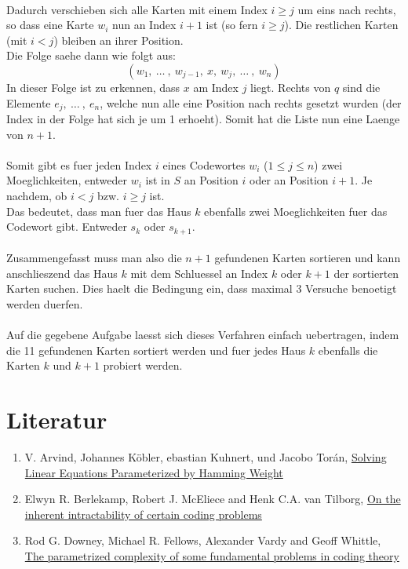 \documentclass[a4paper,10pt,ngerman]{scrartcl}
\begin{document}
\\Dadurch verschieben sich alle Karten mit einem Index $i \geq j$ um eins nach rechts, so dass eine Karte $w_i$ nun an Index $i+1$ ist (so fern $i \geq j$). Die restlichen Karten (mit $i < j$) bleiben an ihrer Position.\\
Die Folge saehe dann wie folgt aus:
$$(w_1, \ \dots \ , \ w_{j-1}, \ x, \ w_{j}, \ \dots \ , \ w_n)$$
In dieser Folge ist zu erkennen, dass $x$ am Index $j$ liegt. Rechts von $q$ sind die Elemente $e_{j}, \ \dots \ , \ e_n$, welche nun alle eine Position nach rechts  gesetzt wurden (der Index in der Folge hat sich je um 1 erhoeht). Somit hat die Liste nun eine Laenge von $n+1$.
\\\\
Somit gibt es fuer jeden Index $i$ eines Codewortes $w_i$ ($1 \leq j \leq n$) zwei Moeglichkeiten, entweder $w_i$ ist in $S$ an Position $i$ oder an Position $i+1$.
Je nachdem, ob $i < j$ bzw. $i \geq j$ ist.\\
Das bedeutet, dass man fuer das Haus $k$ ebenfalls zwei Moeglichkeiten fuer das Codewort gibt. Entweder $s_k$ oder $s_{k+1}$. 
\\\\
Zusammengefasst muss man also die $n+1$ gefundenen Karten sortieren und kann anschlieszend das Haus $k$ mit dem Schluessel an Index $k$ oder $k+1$ der sortierten Karten suchen. Dies haelt die Bedingung ein, dass maximal 3 Versuche benoetigt werden duerfen.
\\\\
Auf die gegebene Aufgabe laesst sich dieses Verfahren einfach uebertragen, indem die 11 gefundenen Karten sortiert werden und fuer jedes Haus $k$ ebenfalls die Karten $k$ und $k+1$ probiert werden. 

\section{Literatur}
\begin{enumerate}
	\item V. Arvind, Johannes Köbler, ebastian Kuhnert, und Jacobo Torán, \href{https://www.informatik.hu-berlin.de/de/forschung/gebiete/algorithmenII/Publikationen/Papers/oddeven.pdf}{Solving Linear Equations Parameterized by Hamming Weight}
	\item Elwyn R. Berlekamp, Robert J. McEliece and Henk C.A. van Tilborg, \href{https://ieeexplore.ieee.org/document/1055873}{On the inherent intractability of certain coding problems}
	\item Rod G. Downey, Michael R. Fellows, Alexander Vardy and Geoff Whittle, \href{https://epubs.siam.org/doi/10.1137/S0097539797323571}{The parametrized complexity of some fundamental problems in coding theory}
\end{enumerate}
\end{document}
